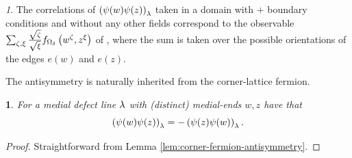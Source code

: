 \documentclass[12pt,oneside,english]{amsart}
\numberwithin{equation}{section}
\numberwithin{figure}{section}
\theoremstyle{plain}
\theoremstyle{plain}
\theoremstyle{plain}
\theoremstyle{plain}
\newtheorem{lem}[thm]{\protect\lemmaname}
\theoremstyle{remark}
\newtheorem{rem}[thm]{\protect\remarkname}
\theoremstyle{definition}
\theoremstyle{plain}
\theoremstyle{plain}
\numberwithin{thm}{section}
\providecommand{\lemmaname}{Lemma}
\providecommand{\remarkname}{Remark}
\providecommand{\lemmaname}{Lemma}
\providecommand{\remarkname}{Remark}
\providecommand{\lemmaname}{Lemma}
\providecommand{\remarkname}{Remark}
\providecommand{\lemmaname}{Lemma}
\providecommand{\remarkname}{Remark}
\begin{document}
\begin{rem}
The correlations of 
$\left( {\psi}(w)  {\psi}(z)  \right)_{{\lambda}}$
taken in a domain with $+$ boundary conditions and without any other
fields correspond to the observable 
$\sum_{\zeta,\xi} \frac{\sqrt{\zeta}}{\sqrt{\xi}}
    f_{{{\Omega}}_{{\delta}}} \left( w^{\zeta} , z^{\xi} \right)$
of \cite{hongler}, where the sum is taken over the possible orientations
of the edges $e(w) $ and $e(z) $. 
\end{rem}

The antisymmetry is naturally inherited from the corner-lattice fermion. 
\begin{lem}
\label{lem:medial-fermion-antisymmetry}For a medial defect line
${\lambda}$ with (distinct) medial-ends $w,z$ have that 
\[ \left( {\psi}(w)  {\psi}(z)  \right)_{{\lambda}}
    = - \left( {\psi}(z)  {\psi}(w)  \right)_{{\lambda}} . \]
\end{lem}
\begin{proof}
Straightforward from Lemma \ref{lem:corner-fermion-antisymmetry}. 
\end{proof}
\end{document}
